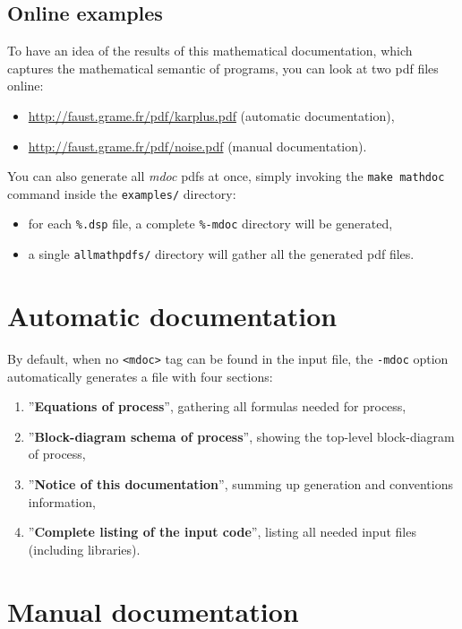 \documentclass[a4paper]{book}
\begin{document}
\subsection{Online examples}
\label{sec:mdoc-examples}

To have an idea of the results of this mathematical documentation, which captures the mathematical semantic of \faust programs, you can look at two pdf files online:
\begin{itemize}
\item \url{http://faust.grame.fr/pdf/karplus.pdf} (automatic documentation),
\item \url{http://faust.grame.fr/pdf/noise.pdf} (manual documentation).
\end{itemize}

You can also generate all \emph{mdoc} pdfs at once, simply invoking the \lstinline!make mathdoc! command inside the \lstinline!examples/! directory: 
\begin{itemize}
\item for each \lstinline!%.dsp! file, a complete \lstinline!%-mdoc! directory will be generated,
\item a single \lstinline!allmathpdfs/! directory will gather all the generated pdf files.
\end{itemize}


\section{Automatic documentation}
\label{sec:auto-docum}

By default, when no \lstinline!<mdoc>! tag can be found in the input \faust file, the \lstinline!-mdoc! option automatically generates a \latex file with four sections:
\begin{enumerate}
\item ''\textbf{Equations of process}'', gathering all formulas needed for process,
\item ''\textbf{Block-diagram schema of process}'', showing the top-level block-diagram of process,
\item ''\textbf{Notice of this documentation}'', summing up generation and conventions information,
\item ''\textbf{Complete listing of the input code}'', listing all needed input files (including libraries).
\end{enumerate}


\section{Manual documentation}
\label{sec:manual-mdoc}
\end{document}
